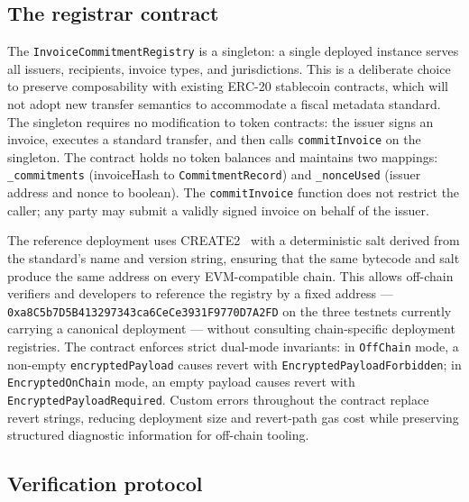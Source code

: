 \documentclass[11pt,a4paper]{article}
\begin{document}
\subsection{The registrar contract}

The \texttt{InvoiceCommitmentRegistry} is a singleton: a single deployed instance serves all issuers, recipients, invoice types, and jurisdictions. This is a deliberate choice to preserve composability with existing ERC-20 stablecoin contracts, which will not adopt new transfer semantics to accommodate a fiscal metadata standard. The singleton requires no modification to token contracts: the issuer signs an invoice, executes a standard transfer, and then calls \texttt{commitInvoice} on the singleton. The contract holds no token balances and maintains two mappings: \texttt{\_commitments} (invoiceHash to \texttt{CommitmentRecord}) and \texttt{\_nonceUsed} (issuer address and nonce to boolean). The \texttt{commitInvoice} function does not restrict the caller; any party may submit a validly signed invoice on behalf of the issuer.

The reference deployment uses CREATE2~\cite{create2} with a deterministic salt derived from the standard's name and version string, ensuring that the same bytecode and salt produce the same address on every EVM-compatible chain. This allows off-chain verifiers and developers to reference the registry by a fixed address --- \texttt{0xa8C5b7D5B413297343ca6CeCe3931F9770D7A2FD} on the three testnets currently carrying a canonical deployment --- without consulting chain-specific deployment registries. The contract enforces strict dual-mode invariants: in \texttt{OffChain} mode, a non-empty \texttt{encryptedPayload} causes revert with \texttt{EncryptedPayloadForbidden}; in \texttt{EncryptedOnChain} mode, an empty payload causes revert with \texttt{EncryptedPayloadRequired}. Custom errors throughout the contract replace revert strings, reducing deployment size and revert-path gas cost while preserving structured diagnostic information for off-chain tooling.

\subsection{Verification protocol}
\label{subsec:verif}
\end{document}
